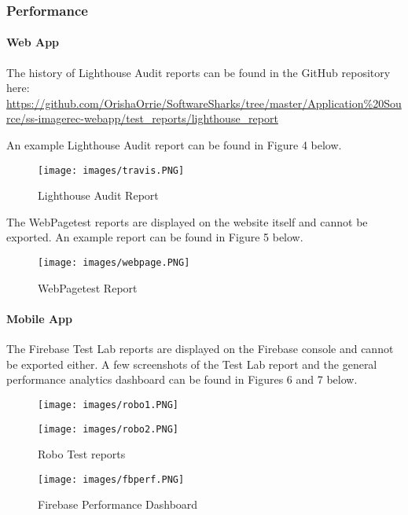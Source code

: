 \documentclass[a4paper, 11pt]{article}
\begin{document}
        \subsubsection{Performance}
            \paragraph{Web App}
            The history of Lighthouse Audit reports can be found in the GitHub repository here: \url{https://github.com/OrishaOrrie/SoftwareSharks/tree/master/Application\%20Source/ss-imagerec-webapp/test_reports/lighthouse_report}
    
            An example Lighthouse Audit report can be found in Figure 4 below.
            \begin{figure}[H]
                \texttt{[image: images/travis.PNG]}
                \caption{Lighthouse Audit Report}
                \label{fig:lh_test}
            \end{figure}
            
            The WebPagetest reports are displayed on the website itself and cannot be exported. An example report can be found in Figure 5 below.
            \begin{figure}[H]
                \texttt{[image: images/webpage.PNG]}
                \caption{WebPagetest Report}
                \label{fig:wp_test}
            \end{figure}
            
            \paragraph{Mobile App}
            The Firebase Test Lab reports are displayed on the Firebase console and cannot be exported either. A few screenshots of the Test Lab report and the general performance analytics dashboard can be found in Figures 6 and 7 below.
            \begin{figure}[H]
                \texttt{[image: images/robo1.PNG]}
            \end{figure}
            \begin{figure}[H]
                \texttt{[image: images/robo2.PNG]}
                \caption{Robo Test reports}
                \label{fig:wp_test}
            \end{figure}
            \begin{figure}[H]
                \texttt{[image: images/fbperf.PNG]}
                \caption{Firebase Performance Dashboard}
                \label{fig:fb_test}
            \end{figure}
        
\end{document}
